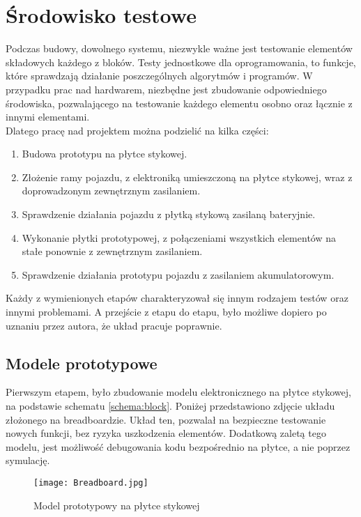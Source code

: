 \section{Środowisko testowe}
\label{sec:testing}
    Podczas budowy, dowolnego systemu, niezwykle ważne jest testowanie elementów składowych każdego z bloków.
    Testy jednostkowe dla oprogramowania, to funkcje, które sprawdzają działanie poszczególnych algorytmów i programów.
    W przypadku prac nad hardwarem, niezbędne jest zbudowanie odpowiedniego środowiska, pozwalającego na testowanie każdego elementu osobno oraz łącznie z innymi elementami.\\
% 
    Dlatego pracę nad projektem można podzielić na kilka części:
    \begin{enumerate}
        \item Budowa prototypu na płytce stykowej.
        \item Złożenie ramy pojazdu, z elektroniką umieszczoną na płytce stykowej, wraz z doprowadzonym zewnętrznym zasilaniem.
        \item Sprawdzenie działania pojazdu z płytką stykową zasilaną bateryjnie.
        \item Wykonanie płytki prototypowej, z połączeniami wszystkich elementów na stałe ponownie z zewnętrznym zasilaniem.
        \item Sprawdzenie działania prototypu pojazdu z zasilaniem akumulatorowym.
    \end{enumerate}
    Każdy z wymienionych etapów charakteryzował się innym rodzajem testów oraz innymi problemami.
    A przejście z etapu do etapu, było możliwe dopiero po uznaniu przez autora, że układ pracuje poprawnie.

    \subsection{Modele prototypowe}
        Pierwszym etapem, było zbudowanie modelu elektronicznego na płytce stykowej, na podstawie schematu \ref{schema:block}.
        Poniżej przedstawiono zdjęcie układu złożonego na breadboardzie.
        Układ ten, pozwalał na bezpieczne testowanie nowych funkcji, bez ryzyka uszkodzenia elementów.
        Dodatkową zaletą tego modelu, jest możliwość debugowania kodu bezpośrednio na płytce, a nie poprzez symulację.
        \begin{figure}[!ht]
            \centering
            \texttt{[image: Breadboard.jpg]}
            \caption{Model prototypowy na płytce stykowej}
            \label{fig:breadboard}
        \end{figure}

